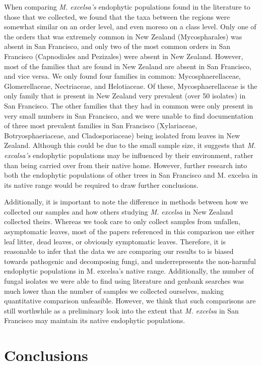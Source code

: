 \documentclass[fleqn,10pt,lineno]{wlpeerj} %
\begin{document}
When comparing \emph{M. excelsa's} endophytic populations found in the literature to those that we collected, we found that the taxa between the regions were somewhat similar on an order level, and even moreso on a class level. Only one of the orders that was extremely common in New Zealand (Mycospharales) was absent in San Francisco, and only two of the most common orders in San Francisco (Capnodiales and Pezizales) were absent in New Zealand. However, most of the families that are found in New Zealand are absent in San Francisco, and vice versa. We only found four families in common: Mycosphaerellaceae, Glomerellaceae, Nectriaceae, and Helotiaceae. Of these, Mycosphaerellaceae is the only family that is present in New Zealand very prevalent (over 50 isolates) in San Francisco. The other families that they had in common were only present in very small numbers in San Francisco, and we were unable to find documentation of three most prevalent families in San Francisco (Xylariaceae, Botryosphaeriaceae, and Cladosporiaceae) being isolated from leaves in New Zealand. Although this could be due to the small sample size, it suggests that \emph{M. excalsa's} endophytic populations may be influenced by their environment, rather than being carried over from their native home. However, further research into both the endophytic populations of other trees in San Francisco and M. excelsa in its native range would be required to draw further conclusions.

Additionally, it is important to note the difference in methods between how we collected our samples and how others studying \emph{M. excelsa} in New Zealand collected theirs. Whereas we took care to only collect samples from unfallen, asymptomatic leaves, most of the papers referenced in this comparison use either leaf litter, dead leaves, or obviously symptomatic leaves. Therefore, it is reasonable to infer that the data we are comparing our results to is biased towards pathogenic and decomposing fungi, and underrepresents the non-harmful endophytic populations in M. excelsa's native range. Additionally, the number of fungal isolates we were able to find using literature and genbank searches was much lower than the number of samples we collected ourselves, making quantitative comparison unfeasible. However, we think that such comparisons are still worthwhile as a preliminary look into the extent that \emph{M. excelsa} in San Francisco may maintain its native endophytic populations.

\hypertarget{conclusions}{%
\section*{Conclusions}\label{conclusions}}
\end{document}
